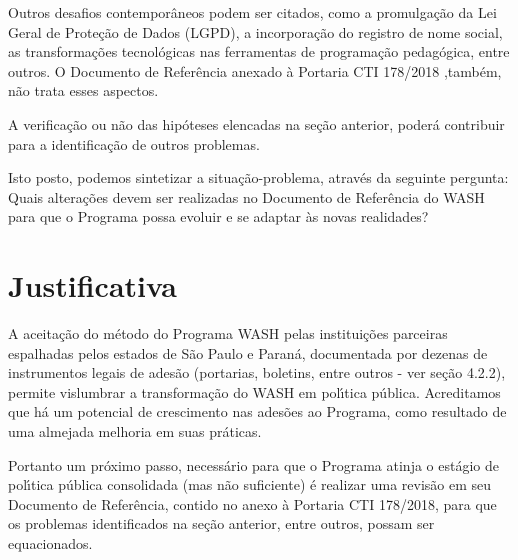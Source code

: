 \documentclass[
12pt,		%
openright,	%
twoside,  %
a4paper,			%
chapter=TITLE,		%
english,			%
french,				%
spanish,			%
brazil				%
]{USPSC-classe/USPSC}
\begin{document}
Outros desafios contempor\^aneos podem ser citados, como a promulga\c{c}\~ao da Lei Geral de Prote\c{c}\~ao de Dados (LGPD), a incorpora\c{c}\~ao do registro de nome social, as transforma\c{c}\~oes tecnol\'ogicas nas ferramentas de programa\c{c}\~ao pedag\'ogica, entre outros. O Documento de Refer\^encia anexado \`a Portaria CTI 178/2018 ,tamb\'em, n\~ao trata esses aspectos.









A verifica\c{c}\~ao ou n\~ao das hip\'oteses elencadas na se\c{c}\~ao anterior, poder\'a contribuir para a identifica\c{c}\~ao de outros problemas.









Isto posto, podemos sintetizar a situa\c{c}\~ao-problema, atrav\'es da seguinte pergunta: \textquotedbl Quais altera\c{c}\~oes devem ser realizadas no Documento de Refer\^encia do WASH para que o Programa possa evoluir e se adaptar \`as novas realidades?\textquotedbl 









\section[Justificativa]{Justificativa}\label{Justificativa}
A aceita\c{c}\~ao do m\'etodo do Programa WASH pelas institui\c{c}\~oes parceiras espalhadas pelos estados de S\~ao Paulo e Paran\'a, documentada por dezenas de instrumentos legais de ades\~ao (portarias, boletins, entre outros - ver se\c{c}\~ao 4.2.2), permite vislumbrar a transforma\c{c}\~ao do WASH em pol\'{\i}tica p\'ublica. Acreditamos que h\'a um potencial de crescimento nas ades\~oes ao Programa, como resultado de uma almejada melhoria em suas pr\'aticas.









Portanto um pr\'oximo passo, necess\'ario para que o Programa atinja o est\'agio de pol\'{\i}tica p\'ublica consolidada (mas n\~ao suficiente) \'e realizar uma revis\~ao em seu Documento de Refer\^encia, contido no anexo \`a Portaria CTI 178/2018, para que os problemas identificados na se\c{c}\~ao anterior, entre outros, possam ser equacionados.
\end{document}
